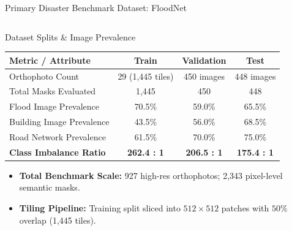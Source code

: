 \documentclass[aspectratio=169, 10pt, professionalfonts]{beamer}
\begin{document}
\begin{frame}{Primary Disaster Benchmark Dataset: FloodNet}
\begin{columns}[T]
    \begin{column}{0.5\textwidth}
      \begin{block}{Dataset Splits \& Image Prevalence}
        \begin{table}[h]
          \tiny
          \centering
          \begin{tabularx}{\textwidth}{l C C C}
            \toprule
            \textbf{Metric / Attribute} & \textbf{Train} & \textbf{Validation} & \textbf{Test} \\
            \midrule
            Orthophoto Count & 29 (1,445 tiles) & 450 images & 448 images \\
            Total Masks Evaluated & 1,445 & 450 & 448 \\
            Flood Image Prevalence & 70.5\% & 59.0\% & 65.5\% \\
            Building Image Prevalence & 43.5\% & 56.0\% & 68.5\% \\
            Road Network Prevalence & 61.5\% & 70.0\% & 75.0\% \\
            \textbf{Class Imbalance Ratio} & \textbf{262.4 : 1} & \textbf{206.5 : 1} & \textbf{175.4 : 1} \\
            \bottomrule
          \end{tabularx}
        \end{table}
        \vspace{-0.5em}
        \begin{itemize}\setlength{\itemsep}{0.2em}\tiny
          \item \textbf{Total Benchmark Scale:} 927 high-res orthophotos; 2,343 pixel-level semantic masks.
          \item \textbf{Tiling Pipeline:} Training split sliced into $512\times512$ patches with $50\%$ overlap (1,445 tiles).
        \end{itemize}
      \end{block}
    \end{column}
  \end{columns}
\end{frame}
\end{document}
